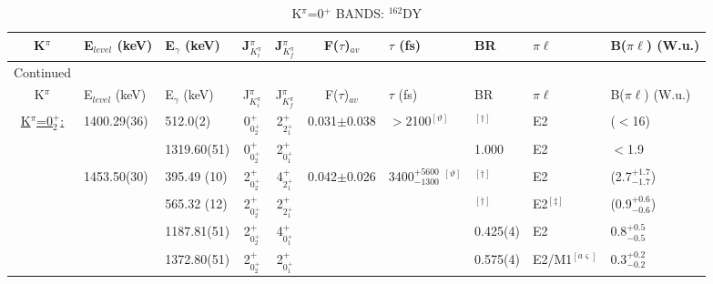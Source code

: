 \begin{landscape}
\begin{center}
\begin{longtable}{cllcccllll}
\caption{K$^\pi$=0$^+$ BANDS: $^{162}$DY \label{tab:162Dy_0s_all}}\\

K$^\pi$                         & E$_{level}$ (keV) & E$_\gamma$ (keV) & J$^\pi_{K^\pi_i}$ & J$^\pi_{K^\pi_f}$ & F($\tau$)$_{av}$ & $\tau$ (fs)                       & BR             & $\pi\ell$         & B($\pi\ell$) (W.u.) \\ \hline \hline \endfirsthead
\caption[]{K$^\pi$=0$^+$ BANDS: $^{162}$DY}{Continued}\\
K$^\pi$                         & E$_{level}$ (keV) & E$_\gamma$ (keV) & J$^\pi_{K^\pi_i}$ & J$^\pi_{K^\pi_f}$ & F($\tau$)$_{av}$ & $\tau$ (fs)                       & BR             & $\pi\ell$         & B($\pi\ell$) (W.u.) \\ \hline \hline \endhead
\underline{K$^\pi$=0$^+_2$:}    & 1400.29(36)  & 512.0(2)                   & 0$^+_{0^+_2}$    & 2$^+_{2^+_1}$ &0.031$\pm$0.038& $>$2100$^{[\vartheta]}$                 & $^{[\dagger]}$ & E2                & ($<$16) \\
                                &              & 1319.60(51)                & 0$^+_{0^+_2}$    & 2$^+_{0^+_1}$ &&                                                     & 1.000          & E2                & $<$1.9   \\
                                & 1453.50(30)  & 395.49 (10)                & 2$^+_{0^+_2}$    & 4$^+_{2^+_1}$ &0.042$\pm$0.026& 3400$^{+5600}_{-1300}$ $^{[\vartheta]}$ & $^{[\dagger]}$ & E2                & (2.7$^{+1.7}_{-1.7}$) \\
                                &              & 565.32 (12)                & 2$^+_{0^+_2}$    & 2$^+_{2^+_1}$ &&                                                     & $^{[\dagger]}$ & E2$^{[\ddagger]}$ & (0.9$^{+0.6}_{-0.6}$) \\
                                &              & 1187.81(51)                & 2$^+_{0^+_2}$    & 4$^+_{0^+_1}$ &&                                                     & 0.425(4)       & E2                & 0.8$^{+0.5}_{-0.5}$                         \\
                                &              & 1372.80(51)                & 2$^+_{0^+_2}$    & 2$^+_{0^+_1}$ &&                                                     & 0.575(4)       & E2/M1$^{[a\varsigma]}$& 0.3$^{+0.2}_{-0.2}$ \\  

\end{longtable}
\end{center}
\end{landscape}
